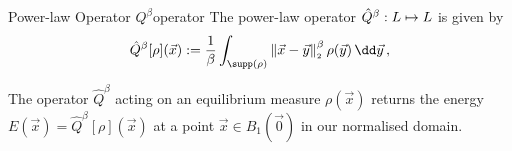 \begin{definition}{Power-law Operator $Q^\beta$}{operator}
  The power-law operator $\hat{Q}^\beta: L \mapsto L$ is given by
  $$\hat{Q}^\beta[\rho](\vec{x}) := \frac{1}{\beta} \int_{\supp(\rho)} \norm{\vec{x}-\vec{y}}^\beta \rho(\vec{y}) \,\dd\vec{y}\,,$$
\end{definition}

The operator $\hat{Q}^\beta$ acting on an equilibrium measure $\rho(\vec{x})$ returns the energy $E(\vec{x}) = \hat{Q}^\beta[\rho](\vec{x})$ at a point $\vec{x} \in B_1(\vec{0})$ in our normalised domain.

